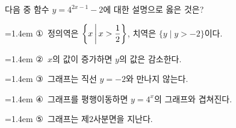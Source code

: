 다음 중 함수 $y=4^{2x-1}-2$에 대한 설명으로 옳은 것은?
\par\medskip\par\noindent\hangindent=1.4em {\small ①}\ 정의역은 $\left\{x\mkern3mu \middle|\mkern3mu x>\dfrac{1}{2}\right\}$, 치역은 $\{y \mid y>-2\}$이다.\par\noindent\hangindent=1.4em {\small ②}\ $x$의 값이 증가하면 $y$의 값은 감소한다.\par\noindent\hangindent=1.4em {\small ③}\ 그래프는 직선 $y=-2$와 만나지 않는다.\par\noindent\hangindent=1.4em {\small ④}\ 그래프를 평행이동하면 $y=4^x$의 그래프와 겹쳐진다.\par\noindent\hangindent=1.4em {\small ⑤}\ 그래프는 제$2$사분면을 지난다.\par\medskip
